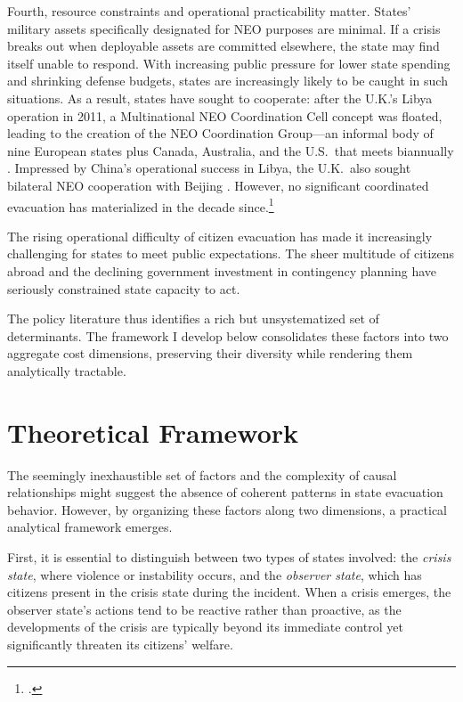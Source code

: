 \documentclass[12pt]{article}
\begin{document}
Fourth, resource constraints and operational practicability matter. States' military assets specifically designated for NEO purposes are minimal. If a crisis breaks out when deployable assets are committed elsewhere, the state may find itself unable to respond. With increasing public pressure for lower state spending and shrinking defense budgets, states are increasingly likely to be caught in such situations. As a result, states have sought to cooperate: after the U.K.'s Libya operation in 2011, a Multinational NEO Coordination Cell concept was floated, leading to the creation of the NEO Coordination Group---an informal body of nine European states plus Canada, Australia, and the U.S.\ that meets biannually \citep{Sutherland2012}. Impressed by China's operational success in Libya, the U.K.\ also sought bilateral NEO cooperation with Beijing \citep{Schwarck2016}. However, no significant coordinated evacuation has materialized in the decade since.\footnote{\citet{Schwarck2016}.}

The rising operational difficulty of citizen evacuation has made it increasingly challenging for states to meet public expectations. The sheer multitude of citizens abroad and the declining government investment in contingency planning have seriously constrained state capacity to act.

The policy literature thus identifies a rich but unsystematized set of determinants. The framework I develop below consolidates these factors into two aggregate cost dimensions, preserving their diversity while rendering them analytically tractable.

\section{Theoretical Framework}

The seemingly inexhaustible set of factors and the complexity of causal relationships might suggest the absence of coherent patterns in state evacuation behavior. However, by organizing these factors along two dimensions, a practical analytical framework emerges.

First, it is essential to distinguish between two types of states involved: the \emph{crisis state}, where violence or instability occurs, and the \emph{observer state}, which has citizens present in the crisis state during the incident. When a crisis emerges, the observer state's actions tend to be reactive rather than proactive, as the developments of the crisis are typically beyond its immediate control yet significantly threaten its citizens' welfare.
\end{document}

